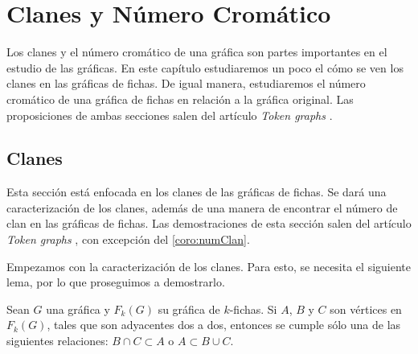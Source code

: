 \chapter{Clanes y N\'umero Crom\'atico}%
\label{cap:Clique-ChromNum}
Los clanes y el n\'umero crom\'atico de una gr\'afica son partes importantes en
el estudio de las gr\'aficas. En este cap\'itulo estudiaremos un poco el c\'omo
se ven los clanes en las gr\'aficas de fichas. De igual manera, estudiaremos el
n\'umero crom\'atico de una gr\'afica de fichas en relaci\'on a la gr\'afica
original. Las proposiciones de ambas secciones salen del art\'iculo
\textit{Token graphs} \cite{fabilaToken}. 

\section{Clanes}%
\label{sec:clanes}

Esta secci\'on est\'a enfocada en los clanes de las gr\'aficas de fichas. Se
dar\'a una caracterizaci\'on de los clanes, adem\'as de una manera de encontrar
el n\'umero de clan en las gr\'aficas de fichas. Las demostraciones de esta
secci\'on salen del art\'iculo \textit{Token graphs} \cite{fabilaToken}, con
excepci\'on del \cref{coro:numClan}.

Empezamos con la caracterizaci\'on de los clanes. Para esto, se necesita el
siguiente lema, por lo que proseguimos a demostrarlo.

\begin{lema}%
\label{lem:K3}
    Sean $G$ una gr\'afica y $F_k(G)$ su gr\'afica de $k$-fichas. Si $A$, $B$ y
    $C$ son v\'ertices en $F_k(G)$, tales que son adyacentes dos a dos, entonces
    se cumple s\'olo una de las siguientes relaciones: $B \cap C \subset A$ o $A
    \subset B \cup C$.
\end{lema}

